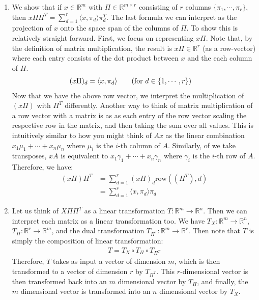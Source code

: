 \documentclass{harvardml}
\theoremstyle{plain}
\begin{document}
\begin{enumerate}[label=(\alph*)]
\item We show that if $x \in \mathbb{R}^m$ with $\Pi \in \mathbb{R}^{m \times r}$ consisting of $r$ columns $\{\pi_1, \cdots, \pi_r\}$, then $x \Pi \Pi^T = \sum_{d=1}^r \langle x, \pi_d \rangle \pi_d^T$. The last formula we can interpret as the projection of $x$ onto the space span of the columns of $\Pi$.
To show this is relatively straight forward. First, we focus on representing $x\Pi$. Note that, by the definition of matrix multiplication, the result is $x\Pi \in \mathbb{R}^r$ (as a row-vector) where each entry consists of the dot product between $x$ and the each column of $\Pi$.
\begin{align*}
(x\Pi)_d &= \langle x, \pi_d \rangle \tag{for $d \in \{1,\cdots,r\}$}
\end{align*}
Now that we have the above row vector, we interpret the multiplication of $(x\Pi)$ with $\Pi^T$ differently. Another way to think of matrix multiplication of a row vector with a matrix is as as each entry of the row vector scaling the respective row in the matrix, and then taking the sum over all values. This is intuitively similar to how you might think of $Ax$ as the linear combination $x_1\mu_1 + \cdots + x_n\mu_n$ where $\mu_i$ is the $i$-th column of $A$. Similarly, of we take transposes, $xA$ is equivalent to $x_1\gamma_1 + \cdots + x_n\gamma_n$ where $\gamma_i$ is the $i$-th row of $A$. Therefore, we have:
\begin{align*}
(x\Pi)\Pi^T &= \sum_{d=1}^{r} (x\Pi)_d \text{row}((\Pi^T),d) \\
&= \sum_{d=1}^r \langle x, \pi_d \rangle \pi_d
\end{align*}


\item Let us think of $X\Pi\Pi^T$ as a linear transformation $T: \mathbb{R}^m \to \mathbb{R}^n$. Then we can interpret each matrix as a linear transformation too. We have $T_X: \mathbb{R}^m \to \mathbb{R}^n$, $T_{\Pi}: \mathbb{R}^r \to \mathbb{R}^{m}$, and the dual transformation $T_{\Pi^T}: \mathbb{R}^m \to \mathbb{R}^r$. Then note that $T$ is simply the composition of linear transformation:
\begin{align*}
T = T_X \circ T_{\Pi} \circ T_{\Pi^T}
\end{align*}
Therefore, $T$ takes as input a vector of dimension $m$, which is then transformed to a vector of dimension $r$ by $T_{\Pi^T}$. This $r$-dimensional vector is then transformed back into an $m$ dimensional vector by $T_{\Pi}$, and finally, the $m$ dimensional vector is transformed into an $n$ dimensional vector by $T_X$.\\


\end{enumerate}
\end{document}
